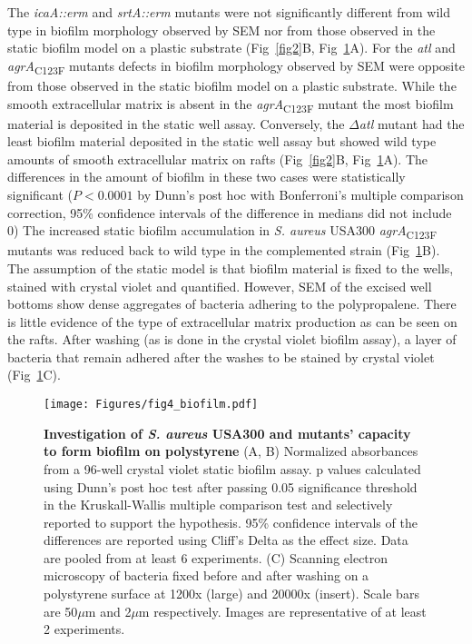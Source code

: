 \documentclass[10pt,letterpaper]{article}
\begin{document}
The \textit{icaA::erm} and \textit{srtA::erm} mutants were not significantly different from wild type in biofilm morphology observed by SEM nor from those observed in the static biofilm model on a plastic substrate (Fig~\ref{fig2}B, Fig~\ref{fig4}A).
For the \textit{atl} and \textit{agrA}\textsubscript{C123F} mutants defects in biofilm morphology observed by SEM were opposite from those observed in the static biofilm model on a plastic substrate.
While the smooth extracellular matrix is absent in the \textit{agrA}\textsubscript{C123F} mutant the most biofilm material is deposited in the static well assay.
Conversely, the $\Delta$\textit{atl} mutant had the least biofilm material deposited in the static well assay but showed wild type amounts of smooth extracellular matrix on rafts (Fig~\ref{fig2}B, Fig~\ref{fig4}A).
The differences in the amount of biofilm in these two cases were statistically significant ($P < 0.0001$ by Dunn's post hoc with Bonferroni's multiple comparison correction, 95\% confidence intervals of the difference in medians did not include 0)
The increased static biofilm accumulation in \textit{S. aureus} USA300 \textit{agrA}\textsubscript{C123F} mutants was reduced back to wild type in the complemented strain (Fig~\ref{fig4}B).
The assumption of the static model is that biofilm material is fixed to the wells, stained with crystal violet and quantified.
However, SEM of the excised well bottoms show dense aggregates of bacteria adhering to the polypropalene.
There is little evidence of the type of extracellular matrix production as can be seen on the rafts.
After washing (as is done in the crystal violet biofilm assay), a layer of bacteria that remain adhered  after the washes to be stained by crystal violet (Fig~\ref{fig4}C).

\begin{figure}[!ht]
\begin{adjustwidth}{-2.25in}{0in}
\texttt{[image: Figures/fig4\_biofilm.pdf]}
\caption[Investigation of \textit{S. aureus} USA300 and mutants' capacity to form biofilm on polystyrene]{
	\textbf{Investigation of \textit{S. aureus} USA300 and mutants' capacity to form biofilm on polystyrene}
	(A, B) Normalized absorbances from a 96-well crystal violet static biofilm assay. p values calculated using Dunn's post hoc test after passing 0.05 significance threshold in the Kruskall-Wallis multiple comparison test and selectively reported to support the hypothesis. 95\% confidence intervals of the differences are reported using Cliff's Delta as the effect size. Data are pooled from at least 6 experiments.
	(C) Scanning electron microscopy of bacteria fixed before and after washing on a polystyrene surface at 1200x (large) and 20000x (insert). Scale bars are 50$\mu$m and 2$\mu$m respectively. Images are representative of at least 2 experiments.}
    \label{fig4}
    \end{adjustwidth}
\end{figure}
\end{document}
